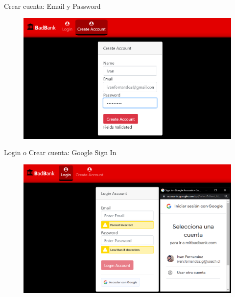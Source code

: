 \documentclass[xcolor=pdftex,dvipsnames,table]{beamer}
\begin{document}
\begin{frame}{Crear cuenta: Email y Password}
    \begin{figure}[htb]
        \centering
        \captionsetup{justification=centering,margin=0.3cm}
        \includegraphics[width=1\linewidth]{func/cuentracrearr.png}
    \end{figure} 
\end{frame}
\begin{frame}{Login o Crear cuenta: Google Sign In}
    \begin{figure}[htb]
        \centering
        \captionsetup{justification=centering,margin=0.3cm}
        \includegraphics[width=1\linewidth]{func/Creacuentagoogle.png}
    \end{figure}
\end{frame}
\end{document}

